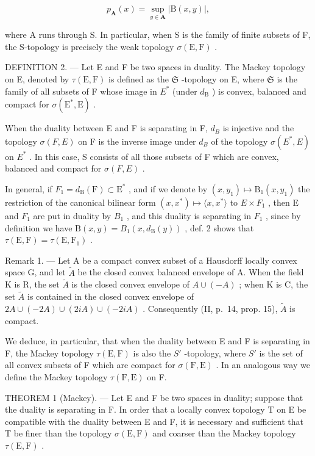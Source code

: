 \[
p _ {\mathbf {A}} (x) = \sup _ {y \in \mathbf {A}} | \mathrm{B} (x, y) |,\tag{2}
\]

where A runs through S. In particular, when S is the family of finite subsets of F, the S-topology is precisely the weak topology \(\sigma(\mathrm{E}, \mathrm{F})\) .

DEFINITION 2. --- Let E and F be two spaces in duality. The Mackey topology on E, denoted by \(\tau(\mathrm{E},\mathrm{F})\) is defined as the \(\mathfrak{S}\) -topology on E, where \(\mathfrak{S}\) is the family of all subsets of F whose image in \(E^{*}\) (under \(d_{\mathrm{B}}\) ) is convex, balanced and compact for \(\sigma(\mathrm{E}^{*},\mathrm{E})\) .

When the duality between E and F is separating in F, \(d_{B}\) is injective and the topology \(\sigma(F, E)\) on F is the inverse image under \(d_{B}\) of the topology \(\sigma(E^{*}, E)\) on \(E^{*}\) . In this case, S consists of all those subsets of F which are convex, balanced and compact for \(\sigma(F, E)\) .

In general, if \(F_{1}=d_{\mathrm{B}}(\mathrm{F})\subset\mathrm{E}^{*}\) , and if we denote by \((x,y_{1})\mapsto\mathrm{B}_{1}(x,y_{1})\) the restriction of the canonical bilinear form \((x,x^{*})\mapsto\langle x,x^{*}\rangle\) to \(E\times F_{1}\) , then E and \(F_{1}\) are put in duality by \(B_{1}\) , and this duality is separating in \(F_{1}\) , since by definition we have \(\mathrm{B}(x,y)=B_{1}(x,d_{\mathrm{B}}(y))\) , def. 2 shows that \(\tau(\mathrm{E},\mathrm{F})=\tau(\mathrm{E},\mathrm{F}_{1})\) .

Remark 1. --- Let A be a compact convex subset of a Hausdorff locally convex space G, and let \(\tilde{A}\) be the closed convex balanced envelope of A. When the field K is R, the set \(\tilde{A}\) is the closed convex envelope of \(A \cup (-A)\) ; when K is C, the set \(\tilde{A}\) is contained in the closed convex envelope of \(2A \cup (-2A) \cup (2iA) \cup (-2iA)\) . Consequently (II, p.~14, prop. 15), \(\tilde{A}\) is compact.

We deduce, in particular, that when the duality between E and F is separating in F, the Mackey topology \(\tau(\mathrm{E},\mathrm{F})\) is also the \(S'\) -topology, where \(S'\) is the set of all convex subsets of F which are compact for \(\sigma(\mathrm{F},\mathrm{E})\) . In an analogous way we define the Mackey topology \(\tau(\mathrm{F},\mathrm{E})\) on F.

THEOREM 1 (Mackey). --- Let E and F be two spaces in duality; suppose that the duality is separating in F. In order that a locally convex topology T on E be compatible with the duality between E and F, it is necessary and sufficient that T be finer than the topology \(\sigma(\mathrm{E},\mathrm{F})\) and coarser than the Mackey topology \(\tau(\mathrm{E},\mathrm{F})\) .

